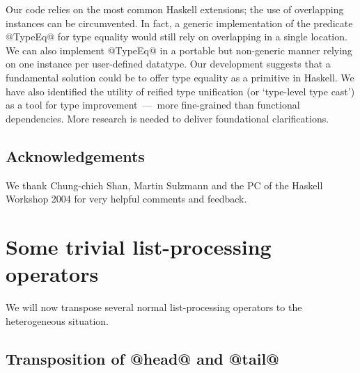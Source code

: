 \documentclass[nocopyrightspace,preprint]{sigplan-proc}
\begin{document}
Our code relies on the most common Haskell extensions; the use of
overlapping instances can be circumvented. In fact, a generic
implementation of the predicate @TypeEq@ for type equality would still
rely on overlapping in a single location. We can also implement
@TypeEq@ in a portable but non-generic manner relying on one instance
per user-defined datatype.  Our development suggests that a
fundamental solution could be to offer type equality as a primitive in
Haskell. We have also identified the utility of reified type
unification (or `type-level type cast') as a tool for type
improvement~---~more fine-grained than functional dependencies. More
research is needed to deliver foundational clarifications.

\smallskip

{\small

\subsection*{Acknowledgements}

We thank Chung-chieh Shan, Martin Sulzmann and the PC of the Haskell
Workshop 2004 for very helpful comments and feedback.

}







\appendix






\section{Some trivial list-processing operators}
\label{A:HList}

We will now transpose several normal list-processing operators to the
heterogeneous situation.

\medskip

\subsection*{Transposition of @head@ and @tail@}
\end{document}

